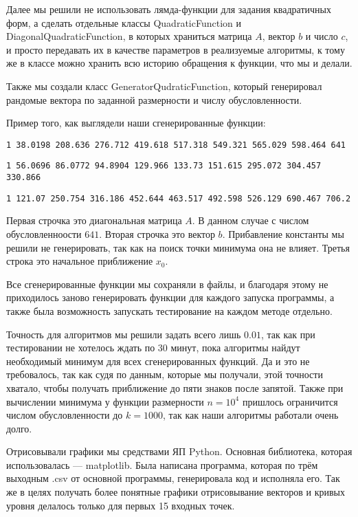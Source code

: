  Далее мы решили не использовать лямда-функции для задания квадратичных форм, а сделать отдельные классы
QuadraticFunction и \newline DiagonalQuadraticFunction, в которых храниться матрица $A$, вектор $b$ и число $c$, и просто
передавать их в качестве параметров в реализуемые алгоритмы, к тому же в классе можно хранить всю историю
 обращения к функции, что мы и делали.

Также мы создали класс GeneratorQudraticFunction, который генерировал рандомые
 вектора по заданной размерности и числу обусловленности.

 Пример того, как выглядели наши сгенерированные функции:
\newline

\texttt{\small 1 38.0198 208.636 276.712 419.618 517.318 549.321 565.029 598.464 641 }

\texttt{\small 1 56.0696 86.0772 94.8904 129.966 133.73 151.615 295.072 304.457 330.866 }

\texttt{\small 1 121.07 250.754 316.186 452.644 463.517 492.598 526.129 690.467 706.2} 
\newline

Первая строчка это диагональная матрица $A$. В данном случае с числом обусловленноости $641$.
Вторая строчка это вектор $b$. Прибавление константы мы решили не генерировать, так как на поиск точки
минимума она не влияет. Третья строка это начальное приближение $x_0$. 

Все сгенерированные функции мы сохраняли в файлы,
и благодаря этому не приходилось заново генерировать функции для каждого запуска программы, а также была
возможность запускать тестирование на каждом методе отдельно. 

Точность для алгоритмов мы решили задать всего лишь $0.01$, так как при тестировании не хотелось ждать по 30 минут, пока
алгоритмы найдут необходимый минимум для всех сгенерированных функций. Да и это не требовалось, так как судя по
данным, которые мы получали, этой точности хватало, чтобы получать приближение до пяти знаков после запятой.
 Также при вычислении минимума 
у функции размерности
$n = 10^4$ пришлось ограничится числом обусловленности до $k = 1000$, так как наши алгоритмы работали очень долго.

Отрисовывали графики мы средствами ЯП Python. Основная библиотека, которая использовалась
 — matplotlib. Была написана программа, которая по трём выходным .csv от основной программы, генерировала
  код и исполняла его. Так же в целях получать более понятные графики
 отрисовывание векторов и кривых уровня делалось только для первых 15 входных точек.

